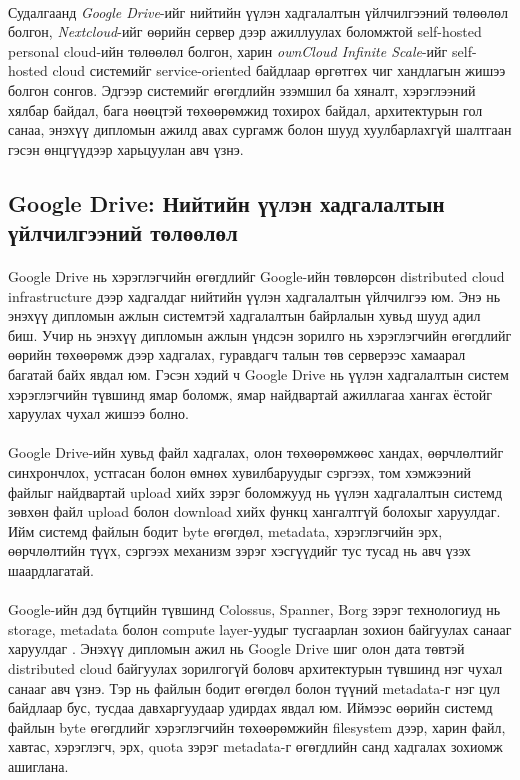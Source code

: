 \paragraph{}
Судалгаанд \textit{Google Drive}-ийг нийтийн үүлэн хадгалалтын үйлчилгээний төлөөлөл болгон, \textit{Nextcloud}-ийг өөрийн сервер дээр ажиллуулах боломжтой self-hosted personal cloud-ийн төлөөлөл болгон, харин \textit{ownCloud Infinite Scale}-ийг self-hosted cloud системийг service-oriented байдлаар өргөтгөх чиг хандлагын жишээ болгон сонгов. Эдгээр системийг өгөгдлийн эзэмшил ба хяналт, хэрэглээний хялбар байдал, бага нөөцтэй төхөөрөмжид тохирох байдал, архитектурын гол санаа, энэхүү дипломын ажилд авах сургамж болон шууд хуулбарлахгүй шалтгаан гэсэн өнцгүүдээр харьцуулан авч үзнэ.

\subsection{Google Drive: Нийтийн үүлэн хадгалалтын үйлчилгээний төлөөлөл}

\paragraph{}
Google Drive нь хэрэглэгчийн өгөгдлийг Google-ийн төвлөрсөн distributed cloud infrastructure дээр хадгалдаг нийтийн үүлэн хадгалалтын үйлчилгээ юм. Энэ нь энэхүү дипломын ажлын системтэй хадгалалтын байрлалын хувьд шууд адил биш. Учир нь энэхүү дипломын ажлын үндсэн зорилго нь хэрэглэгчийн өгөгдлийг өөрийн төхөөрөмж дээр хадгалах, гуравдагч талын төв серверээс хамаарал багатай байх явдал юм. Гэсэн хэдий ч Google Drive нь үүлэн хадгалалтын систем хэрэглэгчийн түвшинд ямар боломж, ямар найдвартай ажиллагаа хангах ёстойг харуулах чухал жишээ болно.

\paragraph{}
Google Drive-ийн хувьд файл хадгалах, олон төхөөрөмжөөс хандах, өөрчлөлтийг синхрончлох, устгасан болон өмнөх хувилбаруудыг сэргээх, том хэмжээний файлыг найдвартай upload хийх зэрэг боломжууд нь үүлэн хадгалалтын системд зөвхөн файл upload болон download хийх функц хангалтгүй болохыг харуулдаг. Ийм системд файлын бодит byte өгөгдөл, metadata, хэрэглэгчийн эрх, өөрчлөлтийн түүх, сэргээх механизм зэрэг хэсгүүдийг тус тусад нь авч үзэх шаардлагатай.

\paragraph{}
Google-ийн дэд бүтцийн түвшинд Colossus, Spanner, Borg зэрэг технологиуд нь storage, metadata болон compute layer-уудыг тусгаарлан зохион байгуулах санааг харуулдаг \cite{google-colossus-storage-layer}. Энэхүү дипломын ажил нь Google Drive шиг олон дата төвтэй distributed cloud байгуулах зорилгогүй боловч архитектурын түвшинд нэг чухал санааг авч үзнэ. Тэр нь файлын бодит өгөгдөл болон түүний metadata-г нэг цул байдлаар бус, тусдаа давхаргуудаар удирдах явдал юм. Иймээс өөрийн системд файлын byte өгөгдлийг хэрэглэгчийн төхөөрөмжийн filesystem дээр, харин файл, хавтас, хэрэглэгч, эрх, quota зэрэг metadata-г өгөгдлийн санд хадгалах зохиомж ашиглана.


